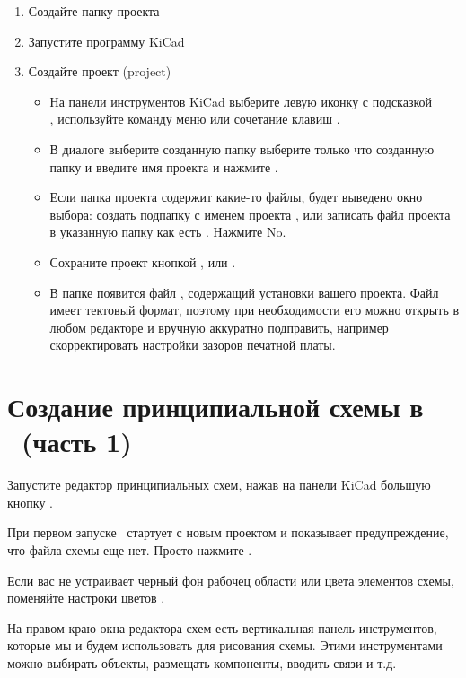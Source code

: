 \begin{enumerate}
  \item Создайте папку проекта 
  \item Запустите программу KiCad
  \item Создайте проект (project)
  \begin{itemize}
    \item 
На панели инструментов KiCad выберите левую иконку с подсказкой\\
, используйте команду меню
 или сочетание клавиш .
    \item 
В диалоге  выберите созданную папку
выберите только что созданную папку  и
введите имя проекта  и нажмите .
	\item
Если папка проекта содержит какие-то файлы, будет выведено окно выбора:
создать подпапку с именем проекта , или записать файл проекта
в указанную папку как есть . Нажмите No.
    \item 
Сохраните проект кнопкой , 
или .
	\item
В папке появится файл , содержащий установки вашего 
проекта. Файл имеет тектовый формат, поэтому при необходимости его можно открыть
в любом редакторе и вручную аккуратно подправить, например скорректировать
настройки зазоров печатной платы.
  \end{itemize}
\end{enumerate}

\section{Создание принципиальной схемы в \ (часть 1)}

Запустите редактор принципиальных схем, нажав на панели KiCad большую кнопку
\icoesch.

При первом запуске \ стартует с новым проектом и
показывает предупреждение, что файла схемы еще нет. Просто нажмите .

Если вас не устраивает черный фон рабочец области или цвета элементов схемы,
поменяйте настроки цветов . 

На правом краю окна редактора схем есть вертикальная панель инструментов,
которые мы и будем использовать для рисования схемы. Этими инструментами можно
выбирать объекты, размещать компоненты, вводить связи и т.д.

